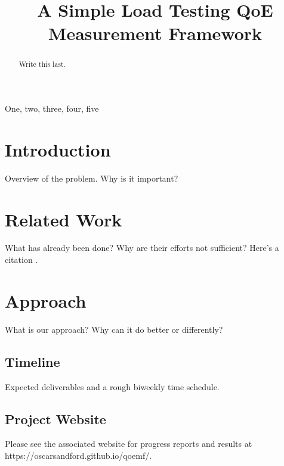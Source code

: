 \documentclass{article}
\title{A Simple Load Testing QoE Measurement Framework}
\begin{document}
%
\maketitle
%
\begin{abstract}
Write this last.
\end{abstract}
%
\begin{keywords}
One, two, three, four, five
\end{keywords}
%
\section{Introduction}
Overview of the problem. Why is it important?

\section{Related Work}
What has already been done? Why are their efforts not sufficient? Here's a citation \cite{Lamp86}.

\section{Approach}
What is our approach? Why can it do better or differently?

\subsection{Timeline}
Expected deliverables and a rough biweekly time schedule.

\subsection{Project Website}
Please see the associated website for progress reports and results at https://oscarsandford.github.io/qoemf/.



\end{document}
